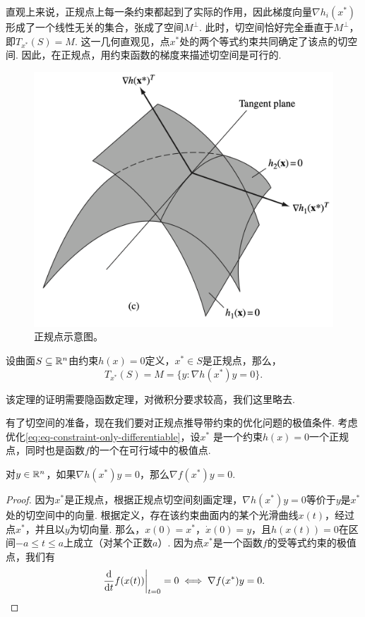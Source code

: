 直观上来说，正规点上每一条约束都起到了实际的作用，因此梯度向量$\nabla h_i({x^\ast})$形成了一个线性无关的集合，张成了空间$M^\perp$. 此时，切空间恰好完全垂直于$M^\perp$，即$T_{x^\ast}(S)=M$. 这一几何直观见，点${x^\ast }$处的两个等式约束共同确定了该点的切空间. 因此，在正规点，用约束函数的梯度来描述切空间是可行的. 
    \begin{figure}
        \centering
        \includegraphics[scale=0.17]{Chapters/duality/figures/tan-2constraint.png}
        \caption{正规点示意图。}
        \label{fig:tan-2constraint}
    \end{figure}

\begin{theorem}[正规点切空间刻画定理]
设曲面$S\subseteq\mathbb{R}^n$由约束$h(x)=0$定义，${x^\ast}\in S$是正规点，那么，
\[T_{x^\ast}(S)=M=\{{y:\nabla h(x^\ast)y=0}\}.\]
\end{theorem}
该定理的证明需要隐函数定理，对微积分要求较高，我们这里略去.

有了切空间的准备，现在我们要对正规点推导带约束的优化问题的极值条件. 考虑优化\eqref{eq:eq-constraint-only-differentiable}，设$x^\ast$ 是一个约束${h(x)=0}$一个正规点，同时也是函数$f$的一个在可行域中的极值点.

\begin{lemma}\label{lemma:eq-opt-cond-1}
对$y\in\mathbb{R}^n$，如果$\nabla {h(x^\ast)y=0}$，那么$\nabla f({x^\ast}){y}=0$.
\end{lemma}

\begin{proof}
因为$x^\ast$是正规点，根据正规点切空间刻画定理，$\nabla h(x^*)y=0$等价于$y$是${x^\ast}$处的切空间中的向量. 根据定义，存在该约束曲面内的某个光滑曲线${x}(t)$，经过点${x^\ast}$，并且以$y$为切向量. 那么，${x}(0)={x^\ast}$，${\dot{x}}(0)={y}$，且${h(x(t))=0}$在区间$-a\le t\le a$上成立（对某个正数$a$）. 因为点${x^\ast}$是一个函数$f$的受等式约束的极值点，我们有
\[\left.\frac{\mathrm{d}}{\mathrm{d} t}f({x}(t))\right|_{t=0}=0\iff \nabla f({x^\ast})y=0.\]
\end{proof}

